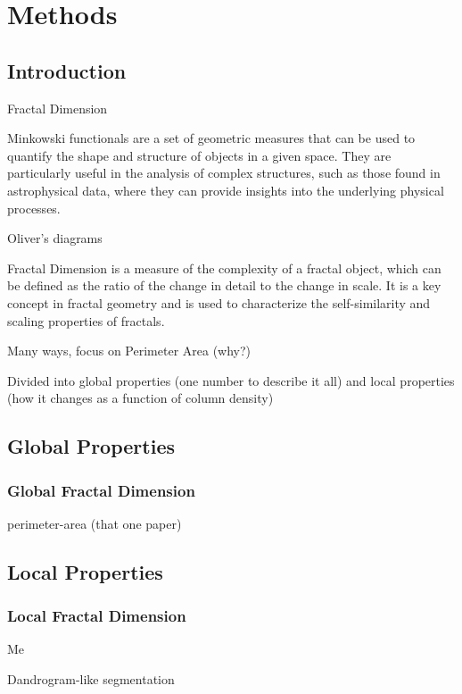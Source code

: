 \chapter{Methods}
\label{ch:methods}

\section{Introduction}

Fractal Dimension

Minkowski functionals are a set of geometric measures that can be used to quantify the shape and structure of objects in a given space. They are particularly useful in the analysis of complex structures, such as those found in astrophysical data, where they can provide insights into the underlying physical processes.

Oliver's diagrams

Fractal Dimension is a measure of the complexity of a fractal object, which can be defined as the ratio of the change in detail to the change in scale. It is a key concept in fractal geometry and is used to characterize the self-similarity and scaling properties of fractals.

Many ways, focus on Perimeter Area (why?)

Divided into global properties (one number to describe it all) and local properties (how it changes as a function of column density)

\section{Global Properties}

\subsection{Global Fractal Dimension}

perimeter-area (that one paper)

\section{Local Properties}

\subsection{Local Fractal Dimension}

Me 

Dandrogram-like segmentation

